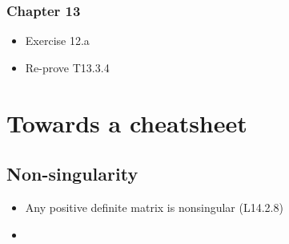 \documentclass[a4paper, oneside]{book}
\begin{document}
\subsection*{Chapter 13}
\begin{itemize}
\item Exercise 12.a
\item Re-prove T13.3.4
\end{itemize}



\clearpage
\chapter*{Towards a cheatsheet}
\section*{Non-singularity}
\begin{itemize}
\item Any positive definite matrix is nonsingular (L14.2.8)
\item 
\end{itemize}









\end{document}
